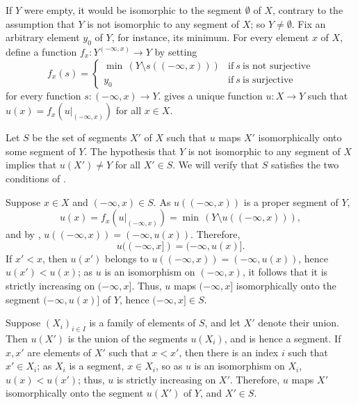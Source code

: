 \documentclass{article}
\begin{document}
\begin{solution}[\ref{exe:eghnwow2}]
  \label{sol:eiv4acyz}
  If \(Y\) were empty, it would be isomorphic to the segment
  \(\emptyset\) of \(X\), contrary to the assumption that \(Y\) is not
  isomorphic to any segment of \(X\); so \(Y \neq \emptyset\).  Fix an
  arbitrary element \(y_0\) of \(Y\), for instance, its minimum.  For
  every element \(x\) of \(X\), define a function
  \(f_x : Y^{(-\infty, x)} \to Y\) by setting
  \begin{displaymath}
    f_x(s) =
    \begin{cases}
      \min \, (Y \setminus s((-\infty, x))) & \text{if} ~ s ~ \text{is
                                              not surjective} \\
      y_0 & \text{if} ~ s ~ \text{is surjective}
    \end{cases}
  \end{displaymath}
  for every function \(s : (-\infty, x) \to Y\).  
  gives a unique function \(u : X \to Y\) such that
  \(u(x) = f_x(u \vert_{(-\infty, x)})\) for all \(x \in X\).

  Let \(S\) be the set of segments \(X'\) of \(X\) such that \(u\)
  maps \(X'\) isomorphically onto some segment of \(Y\).  The
  hypothesis that \(Y\) is not isomorphic to any segment of \(X\)
  implies that \(u(X') \neq Y\) for all \(X' \in S\).  We will verify
  that \(S\) satisfies the two conditions of .

  Suppose \(x \in X\) and \((-\infty, x) \in S\).  As
  \(u((-\infty, x))\) is a proper segment of \(Y\),
  \begin{equation}
    \label{eq:81bkcp3j}
    u(x) = f_x(u \vert_{(-\infty, x)}) =
    \min \, (Y \setminus u((-\infty, x))),
  \end{equation}
  and by , \(u((-\infty, x)) = (-\infty, u(x))\).
  Therefore,
  \begin{displaymath}
    u((-\infty, x]) = (-\infty, u(x)].
  \end{displaymath}
  If \(x' < x\), then \(u(x')\) belongs to
  \(u((-\infty, x)) = (-\infty, u(x))\), hence \(u(x') < u(x)\); as
  \(u\) is an isomorphism on \((-\infty, x)\), it follows that it is
  strictly increasing on \((-\infty, x]\).  Thus, \(u\) maps
  \((-\infty, x]\) isomorphically onto the segment \((-\infty, u(x)]\)
  of \(Y\), hence \((-\infty, x] \in S\).

  Suppose \((X_i)_{i \in I}\) is a family of elements of \(S\), and
  let \(X'\) denote their union.  Then \(u(X')\) is the union of the
  segments \(u(X_i)\), and is hence a segment.  If \(x,x'\) are
  elements of \(X'\) such that \(x < x'\), then there is an index
  \(i\) such that \(x' \in X_i\); as \(X_i\) is a segment,
  \(x \in X_i\), so as \(u\) is an isomorphism on \(X_i\),
  \(u(x) < u(x')\); thus, \(u\) is strictly increasing on \(X'\).
  Therefore, \(u\) maps \(X'\) isomorphically onto the segment
  \(u(X')\) of \(Y\), and \(X' \in S\).


\end{solution}
\end{document}
